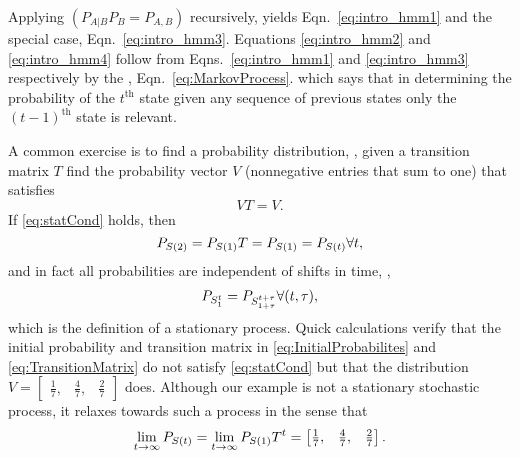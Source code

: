 Applying  $\left( P_{A|B} P_B = P_{A,B} \right)$
recursively, yields Eqn.~\eqref{eq:intro_hmm1} and the special case,
Eqn.~\eqref{eq:intro_hmm3}.  Equations \eqref{eq:intro_hmm2} and
\eqref{eq:intro_hmm4} follow from Eqns.~\eqref{eq:intro_hmm1} and
\eqref{eq:intro_hmm3} respectively by the %
\emph{}, Eqn.~\eqref{eq:MarkovProcess}.
which says that in determining the probability of the $t^\text{th}$
state given any sequence of previous states only the $(t-1)^\text{th}$
state is relevant. %

A common exercise is to find a \emph{} probability
distribution, \ie, given a transition matrix $T$ find the probability
vector $V$ (nonnegative entries that sum to one) that satisfies
\begin{equation}
  \label{eq:statCond}
  VT = V.  
\end{equation}
If \eqref{eq:statCond} holds, then
\begin{equation*}
  P_{{S}{(2)}}  = P_{{S}{(1)}}T = P_{{S}{(1)}} = P_{{S}{(t)}}
  \forall t,
\end{equation*}
and in fact all probabilities are independent of shifts in time, \ie,
\begin{equation*}
  P_{S_{1}^{t}} = P_{S_{1+\tau}^{t+\tau}} \forall (t,\tau),
\end{equation*}
which is the definition of a stationary process.  Quick calculations
verify that the initial probability and transition matrix in
\eqref{eq:InitialProbabilites} and \eqref{eq:TransitionMatrix} do not
satisfy \eqref{eq:statCond} but that the distribution $V =
\begin{bmatrix} \frac{1}{7}, & \frac{4}{7}, & \frac{2}{7}
\end{bmatrix}$ does.  Although our example is not a stationary
stochastic process, it relaxes towards such a process in the sense
that
\begin{equation*}
  \lim_{t \rightarrow \infty} P_{{S}{(t)}} =  \lim_{t \rightarrow
    \infty} P_{{S}{(1)}} T^t = \begin{bmatrix} \frac{1}{7}, & \frac{4}{7}, & \frac{2}{7}
\end{bmatrix}.
\end{equation*}

